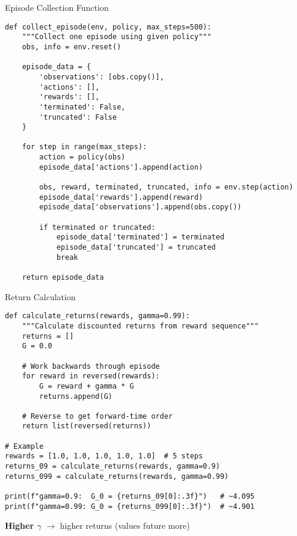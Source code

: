 \documentclass[aspectratio=169,10pt]{beamer}
\begin{document}
\begin{frame}[fragile]{Episode Collection Function}

\begin{lstlisting}
def collect_episode(env, policy, max_steps=500):
    """Collect one episode using given policy"""
    obs, info = env.reset()
    
    episode_data = {
        'observations': [obs.copy()],
        'actions': [],
        'rewards': [],
        'terminated': False,
        'truncated': False
    }
    
    for step in range(max_steps):
        action = policy(obs)
        episode_data['actions'].append(action)
        
        obs, reward, terminated, truncated, info = env.step(action)
        episode_data['rewards'].append(reward)
        episode_data['observations'].append(obs.copy())
        
        if terminated or truncated:
            episode_data['terminated'] = terminated
            episode_data['truncated'] = truncated
            break
    
    return episode_data
\end{lstlisting}

\end{frame}

\begin{frame}[fragile]{Return Calculation}

\begin{lstlisting}
def calculate_returns(rewards, gamma=0.99):
    """Calculate discounted returns from reward sequence"""
    returns = []
    G = 0.0
    
    # Work backwards through episode
    for reward in reversed(rewards):
        G = reward + gamma * G
        returns.append(G)
    
    # Reverse to get forward-time order
    return list(reversed(returns))

# Example
rewards = [1.0, 1.0, 1.0, 1.0, 1.0]  # 5 steps
returns_09 = calculate_returns(rewards, gamma=0.9)
returns_099 = calculate_returns(rewards, gamma=0.99)

print(f"gamma=0.9:  G_0 = {returns_09[0]:.3f}")   # ~4.095
print(f"gamma=0.99: G_0 = {returns_099[0]:.3f}")  # ~4.901
\end{lstlisting}

\textbf{Higher $\gamma$} $\rightarrow$ higher returns (values future more)

\end{frame}
\end{document}
